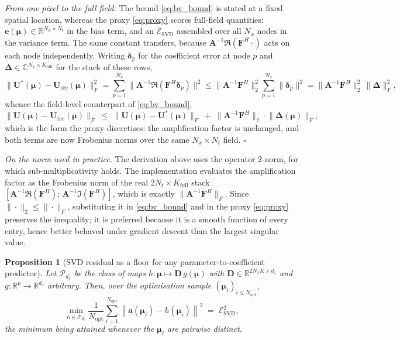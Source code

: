 ﻿\documentclass[a4paper,12pt]{article}
\newtheorem{proposition}{Proposition}[section]
\theoremstyle{definition}
\theoremstyle{remark}
\newcommand{\C}{\mathbb{C}}
\newcommand{\vmu}{\bm{\mu}}
\newcommand{\R}{\mathbb{R}}
\begin{document}
\emph{From one pixel to the full field.} The bound \eqref{eq:bv_bound} is stated at a fixed spatial location, whereas the proxy \eqref{eq:proxy} scores full-field quantities: $\bm{e}(\vmu) \in \R^{N_x \times N_t}$ in the bias term, and an $\mathcal{E}_{\mathrm{SVD}}$ assembled over all $N_x$ nodes in the variance term. The same constant transfers, because $\bm{A}^{-1}\Re(\bm{F}^H\cdot)$ acts on each node independently. Writing $\bm{\delta}_p$ for the coefficient error at node $p$ and $\bm{\Delta} \in \C^{N_x \times K_{\mathrm{full}}}$ for the stack of these rows,
\[
    \|\bm{U}^*(\vmu) - \bm{U}_{\mathrm{rec}}(\vmu)\|_F^2
    = \sum_{p=1}^{N_x} \bigl\|\bm{A}^{-1}\Re(\bm{F}^H\bm{\delta}_p)\bigr\|^2
    \leq \|\bm{A}^{-1}\bm{F}^H\|_2^2 \sum_{p=1}^{N_x}\|\bm{\delta}_p\|^2
    = \|\bm{A}^{-1}\bm{F}^H\|_2^2\,\|\bm{\Delta}\|_F^2 ,
\]
whence the field-level counterpart of \eqref{eq:bv_bound},
\begin{equation}
    \bigl\|\bm{U}(\vmu) - \bm{U}_{\mathrm{rec}}(\vmu)\bigr\|_F
    \;\leq\;
    \bigl\|\bm{U}(\vmu) - \bm{U}^*(\vmu)\bigr\|_F
    \;+\;
    \bigl\|\bm{A}^{-1}\bm{F}^H\bigr\|_2 \cdot \bigl\|\bm{\Delta}(\vmu)\bigr\|_F ,
    \label{eq:bv_bound_field}
\end{equation}
which is the form the proxy discretises: the amplification factor is unchanged, and both terms are now Frobenius norms over the same $N_x \times N_t$ field. \hfill$\square$

\emph{On the norm used in practice.} The derivation above uses the operator $2$-norm, for which sub-multiplicativity holds. The implementation evaluates the amplification factor as the Frobenius norm of the real $2N_t \times K_{\mathrm{full}}$ stack $[\bm{A}^{-1}\Re(\bm{F}^H);\, \bm{A}^{-1}\Im(\bm{F}^H)]$, which is exactly $\|\bm{A}^{-1}\bm{F}^H\|_F$. Since $\|\cdot\|_2 \le \|\cdot\|_F$, substituting it in \eqref{eq:bv_bound} and in the proxy \eqref{eq:proxy} preserves the inequality; it is preferred because it is a smooth function of every entry, hence better behaved under gradient descent than the largest singular value.

\begin{proposition}[SVD residual as a floor for any parameter-to-coefficient predictor]
\label{prop:svd_floor}
Let $\mathcal{P}_{d_z}$ be the class of maps $h : \vmu \mapsto \bm{D}\,g(\vmu)$ with $\bm{D} \in \R^{2N_xK \times d_z}$ and $g : \R^p \to \R^{d_z}$ arbitrary. Then, over the optimisation sample $(\vmu_i)_{i \leq N_{\mathrm{opt}}}$,
\[
    \min_{h \in \mathcal{P}_{d_z}} \frac{1}{N_{\mathrm{opt}}}\sum_{i=1}^{N_{\mathrm{opt}}} \left\|\bm{a}(\vmu_i) - h(\vmu_i)\right\|^2
    \;=\; \mathcal{E}_{\mathrm{SVD}}^2 ,
\]
the minimum being attained whenever the $\vmu_i$ are pairwise distinct.
\end{proposition}
\end{document}
